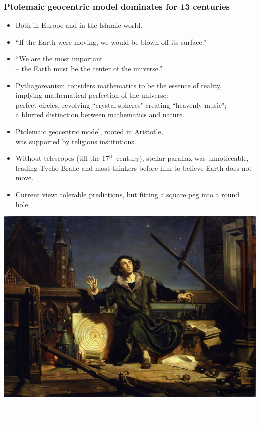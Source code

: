 \documentclass[aspectratio=169,xcolor=pdftex,dvipsnames]{beamer} %
\begin{document}
\begin{frame}
\frametitle{Ptolemaic geocentric model dominates for 13 centuries}

\begin{itemize}
\item
Both in Europe and in the Islamic world.
\item 
``If the Earth were moving, we would be blown off its surface.''
\item
``We are the most important\\ -- the Earth must be the center of the universe.''
\item
Pythagoreanism considers mathematics to be the essence of reality,\\
implying mathematical perfection of the universe: \\
perfect circles, revolving ``crystal spheres" creating ``heavenly music";\\
a blurred distinction between mathematics and nature.
\item
Ptolemaic geocentric model, rooted in Aristotle,\\ was supported by religious institutions.
\item
Without telescopes (till the 17$^{\text{th}}$ century), stellar parallax was unnoticeable, leading Tycho Brahe and most thinkers before him to believe Earth does not move.  
\item
Current view: tolerable predictions, but fitting a square peg into a round hole.     
\end{itemize}

\end{frame}


{
{
    \includegraphics[width=\paperwidth]{copernicus-matejko.jpg}
}
\begin{frame}
\frametitle{\textcolor{white}{Nicolaus Copernicus, 16$^{\text{th}}$ century}}
 
\end{frame}
}
\end{document}
